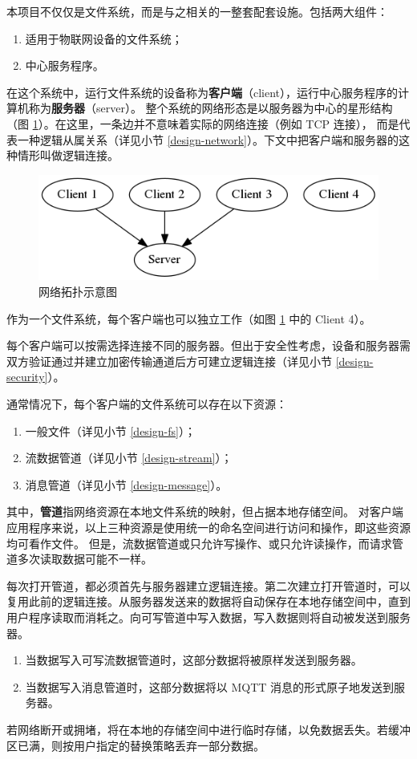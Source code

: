 \documentclass{ctexart}
\begin{document}
本项目不仅仅是文件系统，而是与之相关的一整套配套设施。包括两大组件：
\begin{enumerate}
	\item 适用于物联网设备的文件系统；
	\item 中心服务程序。
\end{enumerate}
在这个系统中，运行文件系统的设备称为\textbf{客户端}（client），运行中心服务程序的计算机称为\textbf{服务器}（server）。
整个系统的网络形态是以服务器为中心的星形结构（图 \ref{design-net-topo}）。在这里，一条边并不意味着实际的网络连接（例如 TCP 连接），
而是代表一种逻辑从属关系（详见小节 \ref{design-network}）。下文中把客户端和服务器的这种情形叫做逻辑连接。

\begin{figure}
	\includegraphics[width=\textwidth]{design-net-topo.png}
	\caption{网络拓扑示意图}
	\label{design-net-topo}
\end{figure}

作为一个文件系统，每个客户端也可以独立工作（如图 \ref{design-net-topo} 中的 Client 4）。

每个客户端可以按需选择连接不同的服务器。但出于安全性考虑，设备和服务器需双方验证通过并建立加密传输通道后方可建立逻辑连接（详见小节 \ref{design-security}）。

通常情况下，每个客户端的文件系统可以存在以下资源：
\begin{enumerate}
	\item 一般文件（详见小节 \ref{design-fs}）；
	\item 流数据管道（详见小节 \ref{design-stream}）；
	\item 消息管道（详见小节 \ref{design-message}）。
\end{enumerate}
其中，\textbf{管道}指网络资源在本地文件系统的映射，但占据本地存储空间。
对客户端应用程序来说，以上三种资源是使用统一的命名空间进行访问和操作，即这些资源均可看作文件。
但是，流数据管道或只允许写操作、或只允许读操作，而请求管道多次读取数据可能不一样。

每次打开管道，都必须首先与服务器建立逻辑连接。第二次建立打开管道时，可以复用此前的逻辑连接。从服务器发送来的数据将自动保存在本地存储空间中，直到用户程序读取而消耗之。向可写管道中写入数据，写入数据则将自动被发送到服务器。
\begin{enumerate}
	\item 当数据写入可写流数据管道时，这部分数据将被原样发送到服务器。
	\item 当数据写入消息管道时，这部分数据将以 MQTT 消息的形式原子地发送到服务器。
\end{enumerate}
若网络断开或拥堵，将在本地的存储空间中进行临时存储，以免数据丢失。若缓冲区已满，则按用户指定的替换策略丢弃一部分数据。
\end{document}
